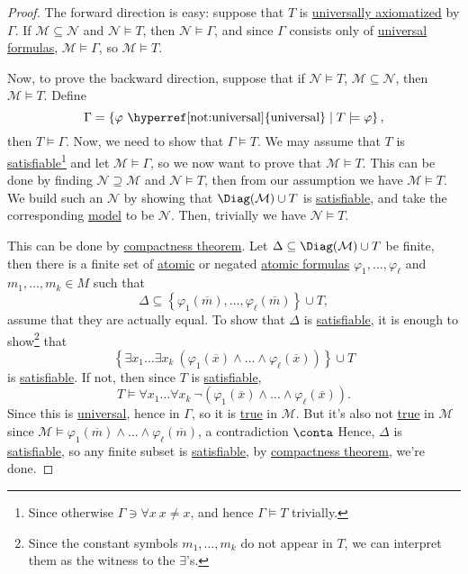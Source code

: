 \begin{proof}
	The forward direction is easy: suppose that \(T\) is \hyperref[def:universally-axiomatizable]{universally axiomatized} by \(\Gamma \). If \(\mathcal{M} \subseteq \mathcal{N} \) and \(\mathcal{N} \models T\), then \(\mathcal{N} \models \Gamma \), and since \(\Gamma \) consists only of \hyperref[not:universal]{universal} \hyperref[def:formula]{formulas}, \(\mathcal{M} \models \Gamma \), so \(\mathcal{M} \models T\).

	Now, to prove the backward direction, suppose that if \(\mathcal{N} \models T\), \(\mathcal{M} \subseteq \mathcal{N} \), then \(\mathcal{M} \models T\). Define
	\[
		\Gamma = \left\{ \varphi \text{ \hyperref[not:universal]{universal}} \mid T \models \varphi \right\},
	\]
	then \(T \models \Gamma \). Now, we need to show that \(\Gamma \models T\). We may assume that \(T\) is \hyperref[def:satisfiable]{satisfiable}\footnote{Since otherwise \(\Gamma \ni \forall x\ x \neq x\), and hence \(\Gamma \models T\) trivially.} and let \(\mathcal{M} \models \Gamma \), so we now want to prove that \(\mathcal{M} \models T\). This can be done by finding \(\mathcal{N} \supseteq \mathcal{M} \) and \(\mathcal{N} \models T\), then from our assumption we have \(\mathcal{M} \models T\). We build such an \(\mathcal{N} \) by showing that \(\Diag(\mathcal{M} ) \cup T\) is \hyperref[def:satisfiable]{satisfiable}, and take the corresponding \hyperref[def:model]{model} to be \(\mathcal{N} \). Then, trivially we have \(\mathcal{N} \models T\).

	This can be done by \hyperref[thm:compactness]{compactness theorem}. Let \(\Delta \subseteq \Diag(\mathcal{M} ) \cup T\)  be finite, then there is a finite set of \hyperref[not:atomic]{atomic} or negated \hyperref[not:atomic]{atomic formulas} \(\varphi _1, \ldots , \varphi _\ell \) and \(m_1, \ldots , m_k \in M\) such that
	\[
		\Delta \subseteq \left\{ \varphi _1(\overline{m} ), \ldots , \varphi _\ell (\overline{m} ) \right\} \cup T,
	\]
	assume that they are actually equal. To show that \(\Delta \) is \hyperref[def:satisfiable]{satisfiable}, it is enough to show\footnote{Since the constant symbols \(m_1, \ldots , m_k\) do not appear in \(T\), we can interpret them as the witness to the \(\exists \)'s.} that
	\[
		\left\{ \exists x_1 \ldots \exists x_k\ (\varphi _1(\overline{x} ) \land \ldots \land \varphi _\ell (\overline{x} )) \right\} \cup T
	\]
	is \hyperref[def:satisfiable]{satisfiable}. If not, then since \(T\) is \hyperref[def:satisfiable]{satisfiable},
	\[
		T\models \forall x_1 \ldots \forall x_k\ \lnot (\varphi _1(\overline{x} ) \land \ldots \land \varphi _\ell (\overline{x} )).
	\]
	Since this is \hyperref[not:universal]{universal}, hence in \(\Gamma \), so it is \hyperref[def:truth]{true} in \(\mathcal{M} \). But it's also not \hyperref[def:truth]{true} in \(\mathcal{M} \) since \(\mathcal{M} \models \varphi _1(\overline{m} ) \land \ldots \land \varphi _\ell (\overline{m} )\), a contradiction \(\conta\) Hence, \(\Delta \) is \hyperref[def:satisfiable]{satisfiable}, so any finite subset is \hyperref[def:satisfiable]{satisfiable}, by \hyperref[thm:compactness]{compactness theorem}, we're done.
\end{proof}